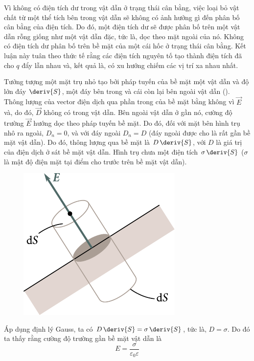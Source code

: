 Vì không có điện tích dư trong vật dẫn ở trạng thái cân bằng, việc loại bỏ vật chất từ một thể tích bên trong vật dẫn sẽ không có ảnh hưởng gì đến phân bố cân bằng của điện tích. Do đó, một điện tích dư sẽ được phân bố trên một vật dẫn rỗng giống như một vật dẫn đặc, tức là, dọc theo mặt ngoài của nó. Không có điện tích dư phân bố trên bề mặt của một cái hốc ở trạng thái cân bằng. Kết luận này tuân theo thức tế rằng các điện tích nguyên tố tạo thành điện tích đã cho $q$ đẩy lẫn nhau và, kết quả là, có xu hướng chiếm các vị trí xa nhau nhất.

Tưởng tượng một mặt trụ nhỏ tạo bởi pháp tuyến của bề mặt một vật dẫn và độ lớn đáy $\deriv{S}$, một đáy bên trong và cái còn lại bên ngoài vật dẫn (). Thông lượng của vector điện dịch qua phần trong của bề mặt bằng không vì $\vec{E}$ và, do đó, $\vec{D}$ không có trong vật dẫn. Bên ngoài vật dẫn ở gần nó, cường độ trường $\vec{E}$ hướng dọc theo pháp tuyến bề mặt. Do đó, đối với mặt bên hình trụ nhô ra ngoài, $D_n=0$, và với đáy ngoài $D_n=D$ (đáy ngoài được cho là rất gần bề mặt vật dẫn). Do đó, thông lượng qua bề mặt là $D\,\deriv{S}$, với $D$ là giá trị của điện dịch ở sát bề mặt vật dẫn. Hình trụ chưa một điện tích $\sigma\,\deriv{S}$ ($\sigma$ là mật độ điện mặt tại điểm cho trước trên bề mặt vật dẫn).

\begin{figure}[!htb]
	\begin{center}
		\includegraphics[scale=1]{figures/ch_03/fig_3_1.pdf}
		\caption[]{}
		\label{fig:3_1}
	\end{center}
	\vspace{-0.8cm}
\end{figure}

Áp dụng định lý Gauss, ta có $D\,\deriv{S}=\sigma\,\deriv{S}$, tức là, $D=\sigma$. Do đó ta thấy rằng cường độ trường gần bề mặt vật dẫn là
\begin{equation}\label{eq:3_3}
    E = \frac{\sigma}{\varepsilon_0\varepsilon}
\end{equation}

